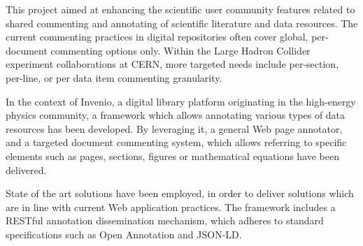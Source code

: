 
This project aimed at enhancing the scientific user community features related
to shared commenting and annotating of scientific literature and data
resources.  The current commenting practices in digital repositories often
cover global, per-document commenting options only. Within the Large Hadron
Collider experiment collaborations at CERN, more targeted needs include
per-section, per-line, or per data item commenting granularity.

In the context of Invenio, a digital library platform originating in the
high-energy physics community, a framework which allows annotating various
types of data resources has been developed. By leveraging it, a general Web
page annotator, and a targeted document commenting system, which allows
referring to specific elements such as pages, sections, figures or mathematical
equations have been delivered.

State of the art solutions have been employed, in order to deliver solutions
which are in line with current Web application practices. The framework
includes a RESTful annotation dissemination mechanism, which adheres to
standard specifications such as Open Annotation and JSON-LD.
